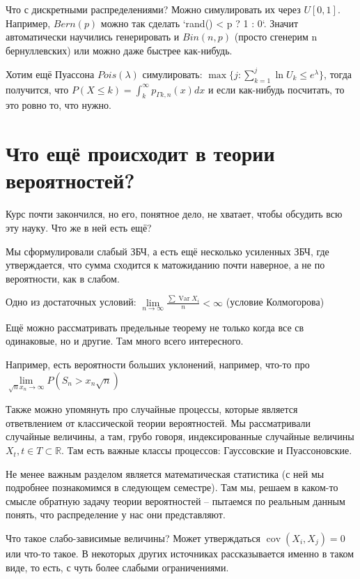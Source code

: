 \documentclass{article}
\DeclareMathOperator{\Var}{Var}
\DeclareMathOperator{\cov}{cov}
\begin{document}
    Что с дискретными распределениями? Можно симулировать их через $U[0, 1]$. Например, $Bern(p)$ можно так сделать `rand() < p ? 1 : 0`. Значит автоматически научились генерировать и $Bin(n, p)$ (просто сгенерим n бернуллевских) или можно даже быстрее как-нибудь.

    Хотим ещё Пуассона $Pois(\lambda)$ симулировать: $\max \{j: \sum_{k=1}^j \ln U_k \le e^\lambda\}$, тогда получится, что $P(X \le k) = \int_k^\infty p_{\Gamma{k, n}} (x) dx$ и если как-нибудь посчитать, то это ровно то, что нужно. 

    \section{Что ещё происходит в теории вероятностей?}
    Курс почти закончился, но его, понятное дело, не хватает, чтобы обсудить всю эту науку. Что же в ней есть ещё? 

    Мы сформулировали слабый ЗБЧ, а есть ещё несколько усиленных ЗБЧ, где утверждается, что сумма сходится к матожиданию почти наверное, а не по вероятности, как в слабом. 

    Одно из достаточных условий: $\lim\limits_{n\to\infty} \frac{\sum \Var X_i}{n} < \infty $ (условие Колмогорова)

    Ещё можно рассматривать предельные теорему не только когда все св одинаковые, но и другие. Там много всего интересного. 

    Например, есть вероятности больших уклонений, например, что-то про $\lim\limits_{\sqrt{n}x_n \to\infty} P(S_n > x_n\sqrt{n})$

    Также можно упомянуть про случайные процессы, которые является ответвлением от классической теории вероятностей. Мы рассматривали случайные величины, а там, грубо говоря, индексированные случайные величины $X_t, t \in T\subset \mathbb R$. Там есть важные классы процессов: Гауссовские и Пуассоновские. 

    Не менее важным разделом является математическая статистика (с ней мы подробнее познакомимся в следующем семестре). Там мы, решаем в каком-то смысле обратную задачу теории вероятностей -- пытаемся по реальным данным понять, что распределение у нас они представляют.

    Что такое слабо-зависимые величины? Может утверждаться $\cov(X_i, X_j) = 0$ или что-то такое. В некоторых других источниках рассказывается именно в таком виде, то есть, с чуть более слабыми ограничениями.
 
\end{document}
